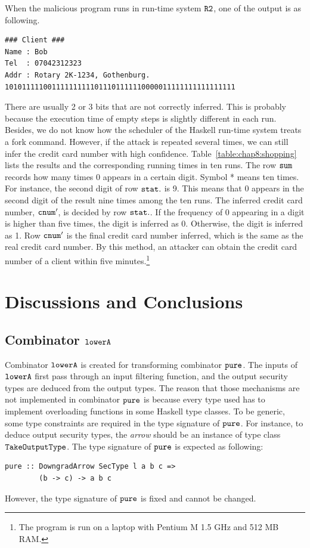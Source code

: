 \documentclass[a4paper]{report}
\newcommand{\co}[1]{$\cod{#1}$}
\begin{document}
When the malicious program runs in run-time system \co{R2}, one of the output is as following.
\begin{Verbatim}[fontsize=\footnotesize]
### Client ###
Name : Bob
Tel  : 07042312323
Addr : Rotary 2K-1234, Gothenburg.
101011111001111111111011101111110000011111111111111111
\end{Verbatim}
There are usually 2 or 3 bits that are not correctly inferred. This is probably because the execution time of 
empty steps is slightly different in each run. Besides, we do not know how the scheduler of the Haskell run-time
system treats a fork command.
However, if the attack is repeated several times, we can still infer the credit card number with high
confidence. Table~\ref{table:chap8:shopping} lists the results and the corresponding running times in ten runs. 
The row \co{sum} records how many times 0 appears in a certain digit. Symbol * means ten times.
For instance, the second digit of row \co{stat.} is 9. This means that 0 appears in the second digit
of the result nine times among the ten runs. The inferred credit card number, \co{cnum'}, 
is decided by row \co{stat.}.
If the frequency of 0 appearing in a digit is higher than five times, the digit is inferred as 0.
Otherwise, the digit is inferred as 1. Row \co{cnum'} is the final credit card number inferred, which
is the same as the real credit card number. By this method, an attacker can obtain the credit card number of a client
within five minutes.\footnote{The program is run on a laptop with Pentium M 1.5 GHz and 512 MB RAM.}




\chapter{Discussions and Conclusions}

\section{Combinator \co{lowerA}}
Combinator \co{lowerA} is created for transforming combinator \co{pure}.
The inputs of \co{lowerA} first pass through an input filtering function, and
the output security types are deduced from the output types.
The reason that those mechanisms are not implemented in combinator \co{pure}
is because every type used has to implement overloading functions in some Haskell type classes.
To be generic, some type constraints are required in the type signature of
\co{pure}. For instance, to deduce output security types, the {\em arrow} should be
an instance of type class \co{TakeOutputType}. The type signature of \co{pure}
is expected as following:
\begin{Verbatim}[fontsize=\footnotesize]
pure :: DowngradArrow SecType l a b c => 
        (b -> c) -> a b c
\end{Verbatim}
However, the type signature of \co{pure} is fixed and cannot be changed.
\end{document}

